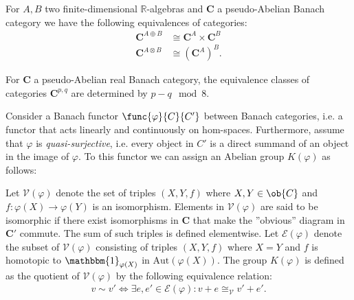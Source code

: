     \begin{property}
        For $A,B$ two finite-dimensional $\mathbb{R}$-algebras and $\mathbf{C}$ a pseudo-Abelian Banach category we have the following equivalences of categories:
        \begin{align}
            \mathbf{C}^{A\oplus B}&\cong\mathbf{C}^A\times\mathbf{C}^B\\
            \mathbf{C}^{A\otimes B}&\cong\left(\mathbf{C}^A\right)^B.
        \end{align}
    \end{property}
    \begin{property}\label{clifford:bott_periodicity_category}
        For $\mathbf{C}$ a pseudo-Abelian real Banach category, the equivalence classes of categories $\mathbf{C}^{p,q}$ are determined by $p-q\mod8$.
    \end{property}

    \begin{construct}\label{clifford:functor_k_group}
        Consider a Banach functor $\func{\varphi}{C}{C'}$ between Banach categories, i.e. a functor that acts linearly and continuously on hom-spaces. Furthermore, assume that $\varphi$ is \textit{quasi-surjective}, i.e. every object in $C'$ is a direct summand of an object in the image of $\varphi$. To this functor we can assign an Abelian group $K(\varphi)$ as follows:

        \qquad Let $\mathscr{V}(\varphi)$ denote the set of triples $(X,Y,f)$ where $X,Y\in\ob{C}$ and $f:\varphi(X)\rightarrow\varphi(Y)$ is an isomorphism. Elements in $\mathscr{V}(\varphi)$ are said to be isomorphic if there exist isomorphisms in $\mathbf{C}$ that make the ''obvious'' diagram in $\mathbf{C'}$ commute. The sum of such triples is defined elementwise. Let $\mathscr{E}(\varphi)$ denote the subset of $\mathscr{V}(\varphi)$ consisting of triples $(X,Y,f)$ where $X=Y$ and $f$ is homotopic to $\mathbbm{1}_{\varphi(X)}$ in $\text{Aut}(\varphi(X))$. The group $K(\varphi)$ is defined as the quotient of $\mathscr{V}(\varphi)$ by the following equivalence relation:
        \begin{gather}
            v\sim v' \iff \exists e,e'\in\mathscr{E}(\varphi):v+e\cong_{\mathscr{V}} v'+e'.
        \end{gather}
    \end{construct}

